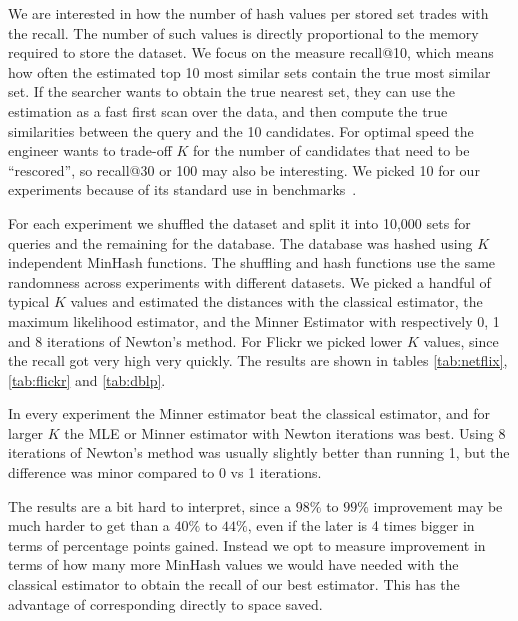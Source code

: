 We are interested in how the number of hash values per stored set trades with the recall.
The number of such values is directly proportional to the memory required to store the dataset.
We focus on the measure recall@10, which means how often the estimated top 10 most similar sets contain the true most similar set.
If the searcher wants to obtain the true nearest set, they can use the estimation as a fast first scan over the data, and then compute the true similarities between the query and the 10 candidates.
For optimal speed the engineer wants to trade-off $K$ for the number of candidates that need to be ``rescored'', so recall@30 or 100 may also be interesting.
We picked 10 for our experiments because of its standard use in benchmarks~\cite{aumuller2017ann}.

For each experiment we shuffled the dataset and split it into 10,000 sets for queries and the remaining for the database.
The database was hashed using $K$ independent MinHash functions.
The shuffling and hash functions use the same randomness across experiments with different datasets.
We picked a handful of typical $K$ values and estimated the distances with the classical estimator, the maximum likelihood estimator, and the Minner Estimator with respectively 0, 1 and 8 iterations of Newton's method.
For Flickr we picked lower $K$ values, since the recall got very high very quickly.
The results are shown in tables \ref{tab:netflix}, \ref{tab:flickr} and \ref{tab:dblp}.

In every experiment the Minner estimator beat the classical estimator, and for larger $K$ the MLE or Minner estimator with Newton iterations was best.
Using 8 iterations of Newton's method was usually slightly better than running 1, but the difference was minor compared to 0 vs 1 iterations.

\smallskip

The results are a bit hard to interpret, since a $98\%$ to $99\%$ improvement may be much harder to get than a $40\%$ to $44\%$, even if the later is 4 times bigger in terms of percentage points gained.
Instead we opt to measure improvement in terms of how many more MinHash values we would have needed with the classical estimator to obtain the recall of our best estimator.
This has the advantage of corresponding directly to space saved.

